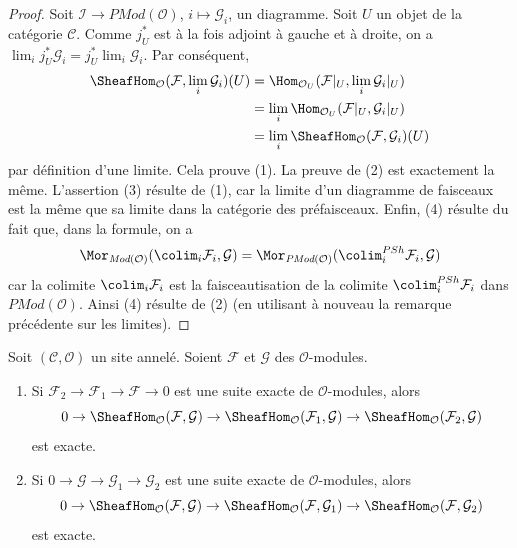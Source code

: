 \begin{proof}
Soit $\mathcal{I} \to \textit{PMod}(\mathcal{O})$,
$i \mapsto \mathcal{G}_i$, un diagramme. Soit $U$ un objet de la catégorie
$\mathcal{C}$. Comme $j_U^*$ est à la fois adjoint à gauche et à droite,
on a
$\lim_i j_U^*\mathcal{G}_i = j_U^* \lim_i \mathcal{G}_i$.
Par conséquent,
\begin{align*}
\SheafHom_\mathcal{O}(\mathcal{F}, \lim_i \mathcal{G}_i)(U)
& =
\Hom_{\mathcal{O}_U}(\mathcal{F}|_U, \lim_i \mathcal{G}_i|_U) \\
& =
\lim_i \Hom_{\mathcal{O}_U}(\mathcal{F}|_U, \mathcal{G}_i|_U) \\
& = \lim_i \SheafHom_\mathcal{O}(\mathcal{F}, \mathcal{G}_i)(U)
\end{align*}
par définition d'une limite. Cela prouve (1). La preuve de (2) est exactement
la même. L'assertion (3) résulte de (1), car la limite d'un diagramme de
faisceaux est la même que sa limite dans la catégorie des préfaisceaux.
Enfin, (4) résulte du fait que, dans la formule, on a
$$
\Mor_{\textit{Mod}(\mathcal{O})}(
\colim_i \mathcal{F}_i, \mathcal{G})
=
\Mor_{\textit{PMod}(\mathcal{O})}(
\colim^{PSh}_i \mathcal{F}_i, \mathcal{G})
$$
car la colimite $\colim_i \mathcal{F}_i$ est la faisceautisation de la
colimite $\colim^{PSh}_i \mathcal{F}_i$ dans
$\textit{PMod}(\mathcal{O})$. Ainsi (4) résulte de (2) (en utilisant à
nouveau la remarque précédente sur les limites).
\end{proof}

\begin{lemma}
\label{lemma-internal-hom-exact}
Soit $(\mathcal{C}, \mathcal{O})$ un site annelé.
Soient $\mathcal{F}$ et $\mathcal{G}$ des $\mathcal{O}$-modules.
\begin{enumerate}
\item Si $\mathcal{F}_2 \to \mathcal{F}_1 \to \mathcal{F} \to 0$ est une
suite exacte de $\mathcal{O}$-modules, alors
$$
0 \to
\SheafHom_\mathcal{O}(\mathcal{F}, \mathcal{G}) \to
\SheafHom_\mathcal{O}(\mathcal{F}_1, \mathcal{G}) \to
\SheafHom_\mathcal{O}(\mathcal{F}_2, \mathcal{G})
$$
est exacte.
\item Si $0 \to \mathcal{G} \to \mathcal{G}_1 \to \mathcal{G}_2$ est une
suite exacte de $\mathcal{O}$-modules, alors
$$
0 \to
\SheafHom_\mathcal{O}(\mathcal{F}, \mathcal{G}) \to
\SheafHom_\mathcal{O}(\mathcal{F}, \mathcal{G}_1) \to
\SheafHom_\mathcal{O}(\mathcal{F}, \mathcal{G}_2)
$$
est exacte.
\end{enumerate}
\end{lemma}

